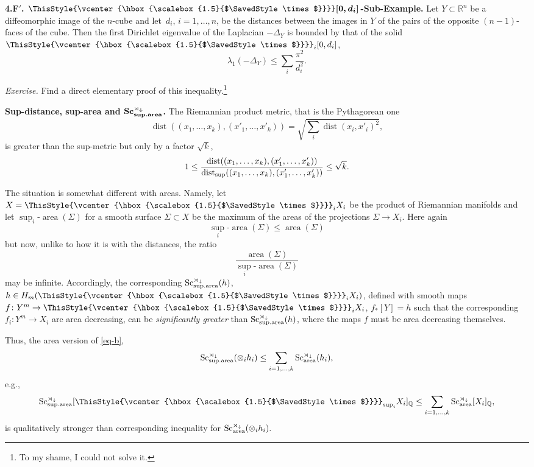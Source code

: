 \documentclass[10pt,a4paper]{amsart}
\numberwithin{equation}{section}
\newcommand\bigtimes{\mathbin{\ThisStyle{\vcenter{\hbox{%
\scalebox{1.5}{$\SavedStyle\times$}}}}}}
\begin{document}
\textbf{4.F$'$. $\boldsymbol{\bigtimes [0,d_i]}$-Sub-Example.} Let $Y\subset\mathbb R^n$ be a diffeomorphic image
 of the $n$-cube and let~$d_i$, $ i=1,\dots,n$, be the distances between
 the images in $Y$ of the pairs of the opposite $(n-1)$-faces of the cube.
Then the first Dirichlet eigenvalue of the Laplacian $-\Delta_Y$
is bounded by that of the solid $\bigtimes_i [0,d_i]$,
\[
\lambda_1(-\Delta_Y)\leq \sum_i\frac{\pi^2}{d^2_i}.
\]

{\it Exercise.} Find a direct elementary proof of this inequality.\footnote{To my shame, I could not solve it.}

\textbf{Sup-distance, sup-area and $\boldsymbol{\operatorname{Sc}_{\rm sup.area}^{\rtimes_\downarrow}}$.} The Riemannian product metric, that is the Pythagorean one
\[
\operatorname{dist}((x_1,\dots,x_k), (x'_1,\dots,x'_k))=\sqrt{ \sum_i\operatorname{dist}(x_i, x'_i)^2},
\]
 is greater than the sup-metric but only by a factor $ \sqrt k$,
\[
1\leq {\operatorname{dist}((x_1,\dots,x_k), (x'_1,\dots,x'_k))\over \operatorname{dist}_{\sup}((x_1,\dots,x_k), (x'_1,\dots,x'_k))}\leq \sqrt k.
\]

The situation is somewhat different with areas. Namely, let $X=\bigtimes_iX_i$
 be the product of Riemannian manifolds and let
 $\sup_i$-$\operatorname{area}(\Sigma)$ for a smooth surface $\Sigma\subset X$ be the maximum of the areas of the projections $\Sigma\to X_i$.
 Here again
 \[
 {\sup_i}\mbox{-}{\operatorname{area}}(\Sigma)\leq \operatorname{area}(\Sigma)
 \]
 but now, unlike to how it is with the distances, the ratio
\[
\frac{\operatorname{area}(\Sigma)}{{\sup_i}\mbox{-}{\operatorname{area}}(\Sigma)}
\]
 may be infinite.
 Accordingly, the corresponding $\operatorname{Sc}_{{\rm sup.area}}^{\rtimes_\downarrow}(h)$,
 $h\in H_m(
 \bigtimes_iX_i)$, defined with smooth maps $f\colon Y^m\to \bigtimes_iX_i$,
 $f_\ast[Y]=h$ such that the corresponding $f_i\colon Y^m\to X_i$ are area decreasing, can be {\it significantly greater}
 than $\operatorname{Sc}_{{\rm sup.area}}^{\rtimes_\downarrow}(h)$, where the maps $f$ must be area decreasing themselves.

 Thus, the area version of \eqref{eq-b},
\begin{equation}\label{eq-c}
\operatorname{Sc}_{\rm sup.area}^{\rtimes_\downarrow}( \otimes_i h_i)\leq\sum_{i=1,\dots,k} \operatorname{Sc}_{\rm area}^{\rtimes_\downarrow}( h_i ),
\end{equation}
 e.g.,
 \[
 \operatorname{Sc}_{\rm sup.area}^{\rtimes_\downarrow}[ \bigtimes_{\sup_i} X_i]_{\mathbb Q}\leq\sum_{i=1,\dots,k} \operatorname{Sc}_{\rm area}^{\rtimes_\downarrow} [X_i]_{\mathbb Q},
 \]
is qualitatively stronger than corresponding inequality for $\operatorname{Sc}_{\rm area}^{\rtimes_\downarrow}( \otimes_i h_i).$
\end{document}
